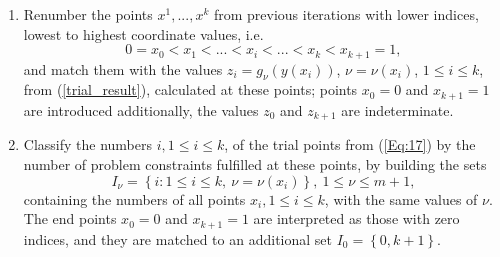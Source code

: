 \documentclass[runningheads]{llncs}
\begin{document}
\begin{enumerate}
\item
Renumber the points $x^1,...,x^k$ from previous iterations with lower indices, lowest to highest
coordinate values, i.e.
\begin{equation}\label{Eq:17}
0=x_0<x_1<...<x_i<...<x_k<x_{k+1}=1,
\end{equation}
and match them with the values $z_i=g_\nu(y(x_i))$, $\nu=\nu(x_i)$, $1 \leq i \leq k$, from
(\ref{trial_result}), calculated at these points; points $x_0=0$ and $x_{k+1}=1$ are introduced
additionally, the values $z_0$ and $z_{k+1}$ are indeterminate.
\item
Classify the numbers $i,1\leq i \leq k$, of the trial points from (\ref{Eq:17}) by the number of
problem constraints fulfilled at these points, by building the sets
\begin{equation}\label{Eq:18}
I_\nu = \left\{i: 1 \leq i \leq k,\ \nu = \nu(x_i)\right\},\ 1 \leq \nu \leq m+1,
\end{equation}
containing the numbers of all points $x_i,1\leq i \leq k$, with the same values of $\nu$. The end
points $x_0=0$ and $x_{k+1}=1$ are interpreted as those with zero indices, and they are
matched to an additional set $I_0= \left\{ 0,k+1 \right\}$.


\end{enumerate}
\end{document}
